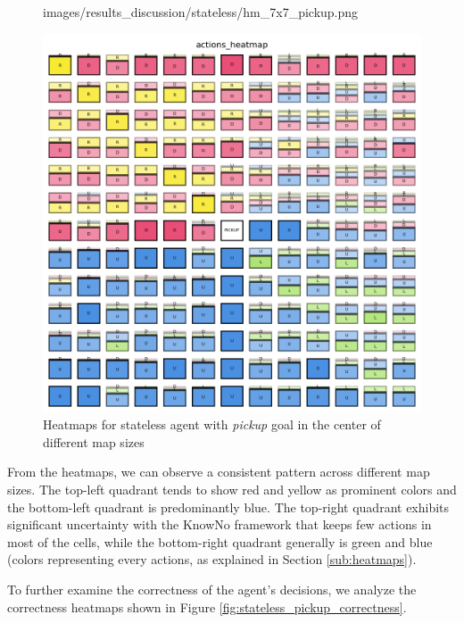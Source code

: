 \begin{figure}[h]
\begin{minipage}[b]{0.32\textwidth}
{      images/results_discussion/stateless/hm_7x7_pickup.png
    }
    \caption{$7 \times 7$}
    \label{fig:hm_7x7_pickup}
  \end{minipage}
  \hfill
  \begin{minipage}[b]{0.32\textwidth}
    \centering
    \includegraphics[width=\textwidth]{
      images/results_discussion/stateless/hm_13x13_pickup.png
    }
    \caption{$13 \times 13$}
    \label{fig:hm_13x13_pickup}
  \end{minipage}
  \caption{Heatmaps for stateless agent with \emph{pickup} goal in the center of
  different map sizes}
  \label{fig:stateless_pickup_heatmaps}
\end{figure}
\vspace{5mm}

From the heatmaps, we can observe a consistent pattern across different map
sizes. The top-left quadrant tends to show red and yellow as prominent colors and
the bottom-left quadrant is predominantly blue. The top-right quadrant exhibits
significant uncertainty with the KnowNo framework that keeps few actions in most
of the cells, while the bottom-right quadrant generally is green and blue (colors
representing every actions, as explained in Section \ref{sub:heatmaps}).

To further examine the correctness of the agent's decisions, we analyze the correctness
heatmaps shown in Figure \ref{fig:stateless_pickup_correctness}.

